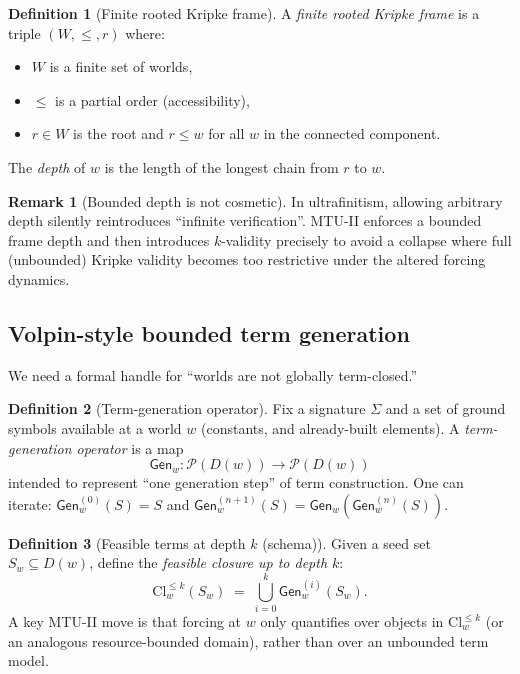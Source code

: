 \documentclass[11pt]{article}
\theoremstyle{definition}
\newtheorem{definition}{Definition}[section]
\newtheorem{remark}{Remark}[section]
\theoremstyle{plain}
\newcommand{\Sig}{\Sigma}
\newcommand{\Pow}{\mathcal{P}}
\begin{document}
\begin{definition}[Finite rooted Kripke frame]
A \emph{finite rooted Kripke frame} is a triple $(W,\le,r)$ where:
\begin{itemize}[leftmargin=1.5em]
\item $W$ is a finite set of worlds,
\item $\le$ is a partial order (accessibility),
\item $r\in W$ is the root and $r\le w$ for all $w$ in the connected component.
\end{itemize}
The \emph{depth} of $w$ is the length of the longest chain from $r$ to $w$.
\end{definition}

\begin{remark}[Bounded depth is not cosmetic]
In ultrafinitism, allowing arbitrary depth silently reintroduces ``infinite verification''.
MTU-II enforces a bounded frame depth and then introduces $k$-validity precisely to avoid a collapse where
full (unbounded) Kripke validity becomes too restrictive under the altered forcing dynamics.
\end{remark}

\subsection{Volpin-style bounded term generation}

We need a formal handle for ``worlds are not globally term-closed.''

\begin{definition}[Term-generation operator]
Fix a signature $\Sig$ and a set of ground symbols available at a world $w$ (constants, and already-built elements).
A \emph{term-generation operator} is a map
\[
\mathsf{Gen}_w : \Pow(D(w)) \to \Pow(D(w))
\]
intended to represent ``one generation step'' of term construction. One can iterate:
$\mathsf{Gen}_w^{(0)}(S)=S$ and $\mathsf{Gen}_w^{(n+1)}(S)=\mathsf{Gen}_w(\mathsf{Gen}_w^{(n)}(S))$.
\end{definition}

\begin{definition}[Feasible terms at depth $k$ (schema)]
Given a seed set $S_w\subseteq D(w)$, define the \emph{feasible closure up to depth $k$}:
\[
\mathrm{Cl}_w^{\le k}(S_w) \;=\; \bigcup_{i=0}^k \mathsf{Gen}_w^{(i)}(S_w).
\]
A key MTU-II move is that forcing at $w$ only quantifies over objects in $\mathrm{Cl}_w^{\le k}$ (or an analogous
resource-bounded domain), rather than over an unbounded term model.
\end{definition}
\end{document}
